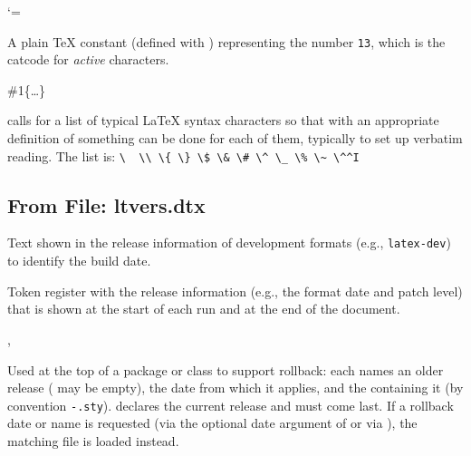 \documentclass{l3in2edoc}
\begin{document}
\begin{function}[]
  {
    \active
  }
  \begin{syntax}
     `\cs{~}=
  \end{syntax}
  A plain \TeX{} constant (defined with ) representing the
  number \texttt{13}, which is the catcode for \emph{active}
  characters.
\end{function}


\begin{function}[]
  {
    \dospecials
  }
  \begin{syntax}
    \#1\{\ldots\}    
  \end{syntax}
   calls  for a list of typical \LaTeX{} syntax
  characters so that with an appropriate definition of 
  something can be done for each of them, typically
   to set up verbatim reading. The list is:
  \verb=\  \\ \{ \} \$ \& \# \^ \_ \% \~ \^^I=
\end{function}






\subsection{From File: ltvers.dtx}


\begin{function}[]
  {
    \development@branch@name
  }
  Text shown in the release information of development formats (e.g.,
  \texttt{latex-dev}) to identify the build date.
\end{function}


\begin{variable}[]
  {
    \LaTeXReleaseInfo
  }
  Token register with the release information (e.g., the format
  date and patch level) that is shown at the start of each run and
  at the end of the document.
\end{variable}


\begin{function}[]
  {
    \DeclareRelease,
    \DeclareCurrentRelease
  }
  \begin{syntax}
       
      
  \end{syntax}
  Used at the top of a package or class to support rollback: each
   names an older release ( may be
  empty), the date from which it applies, and the 
  containing it (by convention
  \texttt{-}\texttt{.sty}).
   declares the current release and must come
  last. If a rollback date or name is requested (via the optional
  date argument of  or via ), the
  matching file is loaded instead.
\end{function}
\end{document}
